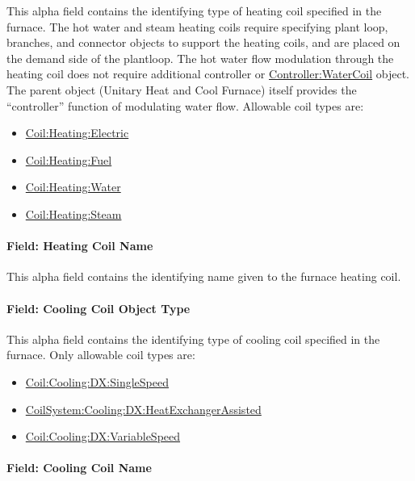 This alpha field contains the identifying type of heating coil specified in the furnace. The hot water and steam heating coils require specifying plant loop, branches, and connector objects to support the heating coils, and are placed on the demand side of the plantloop. The hot water flow modulation through the heating coil does not require additional controller or \hyperref[controllerwatercoil]{Controller:WaterCoil} object. The parent object (Unitary Heat and Cool Furnace) itself provides the ``controller'' function of modulating water flow. Allowable coil types are:

\begin{itemize}
\item
  \hyperref[coilheatingelectric]{Coil:Heating:Electric}
\item
  \hyperref[coilheatinggas-000]{Coil:Heating:Fuel}
\item
  \hyperref[coilheatingwater]{Coil:Heating:Water}
\item
  \hyperref[coilheatingsteam]{Coil:Heating:Steam}
\end{itemize}

\paragraph{Field: Heating Coil Name}\label{field-heating-coil-name-1-000}

This alpha field contains the identifying name given to the furnace heating coil.

\paragraph{Field: Cooling Coil Object Type}\label{field-cooling-coil-object-type-1-000}

This alpha field contains the identifying type of cooling coil specified in the furnace. Only allowable coil types are:

\begin{itemize}
\item
  \hyperref[coilcoolingdxsinglespeed]{Coil:Cooling:DX:SingleSpeed}
\item
  \hyperref[coilsystemcoolingdxheatexchangerassisted]{CoilSystem:Cooling:DX:HeatExchangerAssisted}
\item
  \hyperref[coilcoolingdxvariablespeed]{Coil:Cooling:DX:VariableSpeed}
\end{itemize}

\paragraph{Field: Cooling Coil Name}\label{field-cooling-coil-name-1-000}

